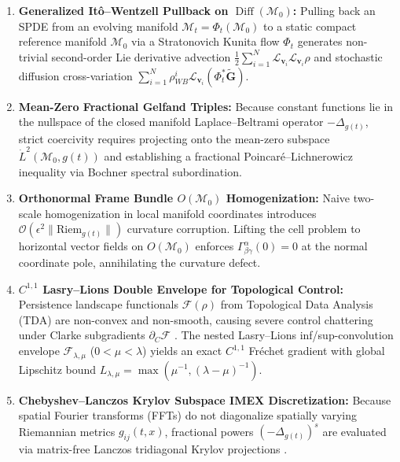 \documentclass[11pt,a4paper,reqno]{article}
\theoremstyle{definition}
\theoremstyle{remark}
\begin{document}
\begin{enumerate}
  \item \textbf{Generalized It\^o--Wentzell Pullback on $\operatorname{Diff}(\mathcal{M}_0)$:} Pulling back an SPDE from an evolving manifold $\mathcal{M}_t = \Phi_t(\mathcal{M}_0)$ to a static compact reference manifold $\mathcal{M}_0$ via a Stratonovich Kunita flow $\Phi_t$ generates non-trivial second-order Lie derivative advection $\frac{1}{2}\sum_{i=1}^N \mathcal{L}_{\mathbf{v}_i}\mathcal{L}_{\mathbf{v}_i}\rho$ and stochastic diffusion cross-variation $\sum_{i=1}^N \rho_{WB}^i \mathcal{L}_{\mathbf{v}_i}(\Phi_t^*\tilde{\mathbf{G}})$.
  \item \textbf{Mean-Zero Fractional Gelfand Triples:} Because constant functions lie in the nullspace of the closed manifold Laplace--Beltrami operator $-\Delta_{g(t)}$, strict coercivity requires projecting onto the mean-zero subspace $\dot{L}^2(\mathcal{M}_0, g(t))$ and establishing a fractional Poincaré--Lichnerowicz inequality via Bochner spectral subordination.
  \item \textbf{Orthonormal Frame Bundle $O(\mathcal{M}_0)$ Homogenization:} Naive two-scale homogenization in local manifold coordinates introduces $\mathcal{O}(\epsilon^2 \|\mathrm{Riem}_{g(t)}\|)$ curvature corruption. Lifting the cell problem to horizontal vector fields on $O(\mathcal{M}_0)$ enforces $\Gamma_{\beta\gamma}^\alpha(0) = 0$ at the normal coordinate pole, annihilating the curvature defect.
  \item \textbf{$C^{1,1}$ Lasry--Lions Double Envelope for Topological Control:} Persistence landscape functionals $\mathcal{F}(\rho)$ from Topological Data Analysis (TDA) \cite{bubenik2015statistical, cohen2007stability} are non-convex and non-smooth, causing severe control chattering under Clarke subgradients $\partial_C\mathcal{F}$ \cite{clarke1990optimization}. The nested Lasry--Lions inf/sup-convolution envelope $\mathcal{F}_{\lambda,\mu}$ ($0 < \mu < \lambda$) \cite{lasry1986remarks, attouch1993approximation} yields an exact $C^{1,1}$ Fréchet gradient with global Lipschitz bound $L_{\lambda,\mu} = \max(\mu^{-1}, (\lambda-\mu)^{-1})$.
  \item \textbf{Chebyshev--Lanczos Krylov Subspace IMEX Discretization:} Because spatial Fourier transforms (FFTs) do not diagonalize spatially varying Riemannian metrics $g_{ij}(t,x)$, fractional powers $(-\Delta_{g(t)})^s$ are evaluated via matrix-free Lanczos tridiagonal Krylov projections \cite{saad1992analysis, higham2008functions}.
\end{enumerate}
\end{document}
